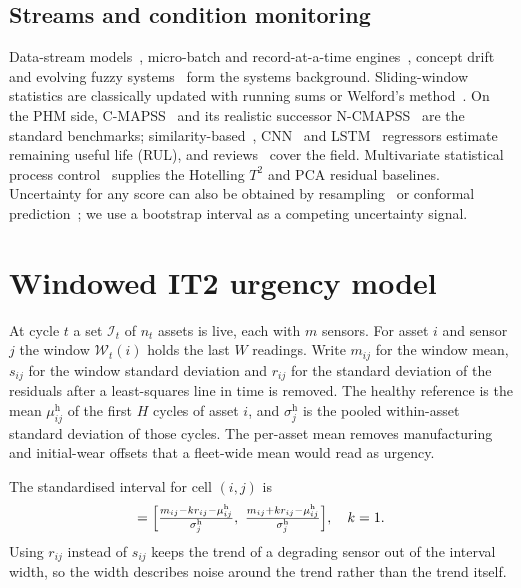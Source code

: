 \documentclass[journal,10pt,twocolumn]{IEEEtran}
\begin{document}
\subsection{Streams and condition monitoring}
Data-stream models~\cite{babcock2002,stonebraker2005}, micro-batch and record-at-a-time engines~\cite{zaharia2013,carbone2015,akidau2015}, concept drift~\cite{gama2014,bifet2010} and evolving fuzzy systems~\cite{kasabov2002,angelov2004,lughofer2011} form the systems background. Sliding-window statistics are classically updated with running sums or Welford's method~\cite{welford1962}. On the PHM side, C-MAPSS~\cite{saxena2008} and its realistic successor N-CMAPSS~\cite{arias2021} are the standard benchmarks; similarity-based~\cite{wang2008}, CNN~\cite{babu2016,li2018} and LSTM~\cite{zheng2017} regressors estimate remaining useful life (RUL), and reviews~\cite{lei2018,sikorska2011,ramasso2014} cover the field. Multivariate statistical process control~\cite{macgregor1995} supplies the Hotelling $T^2$ and PCA residual baselines. Uncertainty for any score can also be obtained by resampling~\cite{efron1993} or conformal prediction~\cite{angelopoulos2023}; we use a bootstrap interval as a competing uncertainty signal.

\section{Windowed IT2 urgency model}
\label{sec:model}
At cycle $t$ a set $\mathcal{I}_t$ of $n_t$ assets is live, each with $m$ sensors. For asset $i$ and sensor $j$ the window $\mathcal{W}_t(i)$ holds the last $W$ readings. Write $m_{ij}$ for the window mean, $s_{ij}$ for the window standard deviation and $r_{ij}$ for the standard deviation of the residuals after a least-squares line in time is removed. The healthy reference is the mean $\mu_{ij}^{\mathrm h}$ of the first $H$ cycles of asset $i$, and $\sigma_j^{\mathrm h}$ is the pooled within-asset standard deviation of those cycles. The per-asset mean removes manufacturing and initial-wear offsets that a fleet-wide mean would read as urgency.

The standardised interval for cell $(i,j)$ is
\begin{equation}
[\underline z_{ij},\overline z_{ij}]=\Bigl[\tfrac{m_{ij}-k r_{ij}-\mu_{ij}^{\mathrm h}}{\sigma_j^{\mathrm h}},\ \tfrac{m_{ij}+k r_{ij}-\mu_{ij}^{\mathrm h}}{\sigma_j^{\mathrm h}}\Bigr],\quad k=1.
\label{eq:zint}
\end{equation}
Using $r_{ij}$ instead of $s_{ij}$ keeps the trend of a degrading sensor out of the interval width, so the width describes noise around the trend rather than the trend itself.
\end{document}

